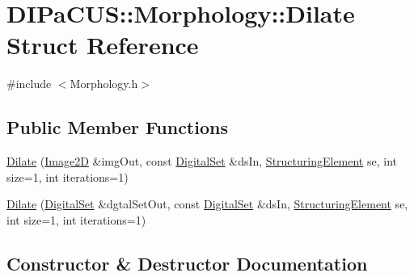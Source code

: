 \hypertarget{structDIPaCUS_1_1Morphology_1_1Dilate}{}\section{D\+I\+Pa\+C\+US\+:\+:Morphology\+:\+:Dilate Struct Reference}
\label{structDIPaCUS_1_1Morphology_1_1Dilate}


{\ttfamily \#include $<$Morphology.\+h$>$}

\subsection*{Public Member Functions}
\begin{DoxyCompactItemize}
\item 
\mbox{\hyperlink{structDIPaCUS_1_1Morphology_1_1Dilate_aad0ed557d31746f99d26fdcfe1629db2}{Dilate}} (\mbox{\hyperlink{namespaceDIPaCUS_1_1Morphology_a9aff9edf28d681accfc54435fbefcbee}{Image2D}} \&img\+Out, const \mbox{\hyperlink{namespaceDIPaCUS_1_1Morphology_ab69fa725716b0ed4c311c0d00a292be7}{Digital\+Set}} \&ds\+In, \mbox{\hyperlink{namespaceDIPaCUS_1_1Morphology_a60b552d68432e7992f09717070d9c4e7}{Structuring\+Element}} se, int size=1, int iterations=1)
\item 
\mbox{\hyperlink{structDIPaCUS_1_1Morphology_1_1Dilate_a031ec2777baa188acdab1aa654c87d68}{Dilate}} (\mbox{\hyperlink{namespaceDIPaCUS_1_1Morphology_ab69fa725716b0ed4c311c0d00a292be7}{Digital\+Set}} \&dgtal\+Set\+Out, const \mbox{\hyperlink{namespaceDIPaCUS_1_1Morphology_ab69fa725716b0ed4c311c0d00a292be7}{Digital\+Set}} \&ds\+In, \mbox{\hyperlink{namespaceDIPaCUS_1_1Morphology_a60b552d68432e7992f09717070d9c4e7}{Structuring\+Element}} se, int size=1, int iterations=1)
\end{DoxyCompactItemize}


\subsection{Constructor \& Destructor Documentation}
\mbox{\label{structDIPaCUS_1_1Morphology_1_1Dilate_aad0ed557d31746f99d26fdcfe1629db2}} 
